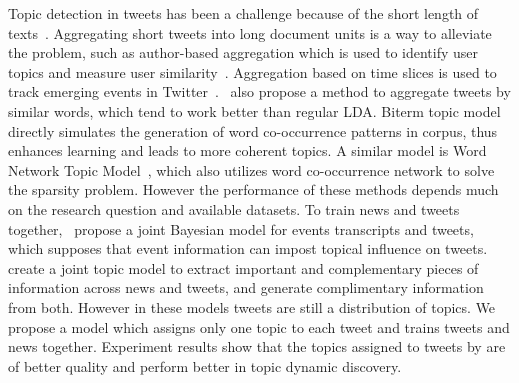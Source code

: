Topic detection in tweets has been a challenge because of the short length of texts~\cite{yan2013biterm,zhao2011comparing}. Aggregating short tweets into long document units is a way to alleviate the problem, such as author-based aggregation which is used to identify user topics and measure user similarity~\cite{weng2010twitterrank}. Aggregation based on time slices is used to track emerging events in Twitter~\cite{lau2012line}.~ also propose a method to aggregate tweets by similar words, which tend to work better than regular LDA. Biterm topic model~\cite[BTM]{yan2013biterm} directly simulates the generation of word co-occurrence patterns in corpus, thus enhances learning and leads to more coherent topics. A similar model is Word Network Topic Model~\cite{zuo2014word}, which also utilizes word co-occurrence network to solve the sparsity problem. However the performance of these methods depends much on the research question and available datasets. To train news and tweets together,~ propose a joint Bayesian model for events transcripts and tweets, which supposes that event information can impost topical influence on tweets.~ create a joint topic model to extract important and complementary pieces of information across news and tweets, and generate complimentary information from both. However in these models tweets are still a distribution of topics. We propose a \stlda model which assigns only one topic to each tweet and trains tweets and news together. Experiment results show that the topics assigned to tweets by \stlda are of better quality and perform better in topic dynamic discovery. 